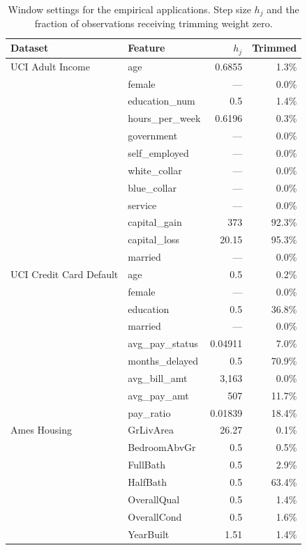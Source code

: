 \documentclass[12pt]{article}
\begin{document}
		\begin{table}[htbp]
		\centering
		\small
		\begin{threeparttable}
		\caption{Window settings for the empirical applications. Step size $h_j$ and the fraction of observations receiving trimming weight zero.}
		\label{tab:window_settings}
		\begin{tabular}{llrr}
			\toprule
			Dataset & Feature & $h_j$ & Trimmed \\
			\midrule
			UCI Adult Income & age & 0.6855 & 1.3\% \\
			& female & --- & 0.0\% \\
			& education\_num & 0.5 & 1.4\% \\
			& hours\_per\_week & 0.6196 & 0.3\% \\
			& government & --- & 0.0\% \\
			& self\_employed & --- & 0.0\% \\
			& white\_collar & --- & 0.0\% \\
			& blue\_collar & --- & 0.0\% \\
			& service & --- & 0.0\% \\
			& capital\_gain & 373 & 92.3\% \\
			& capital\_loss & 20.15 & 95.3\% \\
			& married & --- & 0.0\% \\
			\midrule
			UCI Credit Card Default & age & 0.5 & 0.2\% \\
			& female & --- & 0.0\% \\
			& education & 0.5 & 36.8\% \\
			& married & --- & 0.0\% \\
			& avg\_pay\_status & 0.04911 & 7.0\% \\
			& months\_delayed & 0.5 & 70.9\% \\
			& avg\_bill\_amt & 3,163 & 0.0\% \\
			& avg\_pay\_amt & 507 & 11.7\% \\
			& pay\_ratio & 0.01839 & 18.4\% \\
			\midrule
			Ames Housing & GrLivArea & 26.27 & 0.1\% \\
			& BedroomAbvGr & 0.5 & 0.5\% \\
			& FullBath & 0.5 & 2.9\% \\
			& HalfBath & 0.5 & 63.4\% \\
			& OverallQual & 0.5 & 1.4\% \\
			& OverallCond & 0.5 & 1.6\% \\
			& YearBuilt & 1.51 & 1.4\% \\

\end{tabular}
\end{threeparttable}
\end{table}
\end{document}
